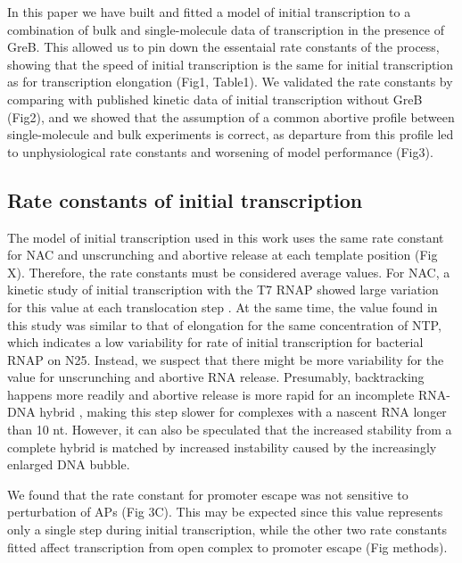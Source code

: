 %
In this paper we have built and fitted a model of initial transcription to a
combination of bulk and single-molecule data of transcription in the presence
of GreB. This allowed us to pin down the essentaial rate constants of the
process, showing that the speed of initial transcription is the same for
initial transcription as for transcription elongation (Fig1, Table1). We
validated the rate constants by comparing with published kinetic data of
initial transcription without GreB (Fig2), and we showed that the assumption
of a common abortive profile between single-molecule and bulk experiments is
correct, as departure from this profile led to unphysiological rate constants
and worsening of model performance (Fig3).

\subsection{Rate constants of initial transcription}
The model of initial transcription used in this work uses the same rate
constant for NAC and unscrunching and abortive release at each template
position (Fig X). Therefore, the rate constants must be considered average
values. For NAC, a kinetic study of initial transcription with the T7 RNAP
showed large variation for this value at each translocation step
\cite{tang_real-time_2009}. At the same time, the value found in this study
was similar to that of elongation for the same concentration of NTP, which
indicates a low variability for rate of initial transcription for bacterial
RNAP on N25. Instead, we suspect that there might be more variability for the
value for unscrunching and abortive RNA release. Presumably, backtracking
happens more readily and abortive release is more rapid for an incomplete
RNA-DNA hybrid \cite{nudler_rnadna_1997,komissarova_shortening_2002}, making
this step slower for complexes with a nascent RNA longer than 10 nt. However,
it can also be speculated that the increased stability from a complete hybrid
is matched by increased instability caused by the increasingly enlarged DNA
bubble.

We found that the rate constant for promoter escape was not sensitive to
perturbation of APs (Fig 3C). This may be expected since this value represents
only a single step during initial transcription, while the other two rate
constants fitted affect transcription from open complex to promoter escape
(Fig methods).

